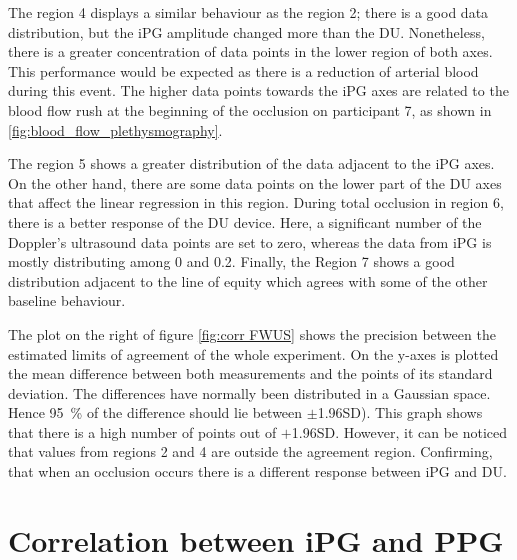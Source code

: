 The region 4 displays a similar behaviour as the region 2; there is a good data distribution, but the iPG amplitude changed more than the DU. Nonetheless, there is a greater concentration of data points in the lower region of both axes. This performance would be expected as there is a reduction of arterial blood during this event. The higher data points towards the iPG axes are related to the blood flow rush at the beginning of the occlusion on participant 7, as shown in \ref{fig:blood_flow_plethysmography}.

The region 5 shows a greater distribution of the data adjacent to the iPG axes. On the other hand, there are some data points on the lower part of the DU axes that affect the linear regression in this region. During total occlusion in region 6, there is a better response of the DU device. Here, a significant number of the Doppler's ultrasound data points are set to zero, whereas the data from iPG is mostly distributing among 0 and 0.2. Finally, the Region 7 shows a good distribution adjacent to the line of equity which agrees with some of the other baseline behaviour.

The plot on the right of figure \ref{fig:corr FWUS} shows the precision between the estimated limits of agreement of the whole experiment.  On the y-axes is plotted the mean difference between both measurements and the points of its standard deviation. The differences have normally been distributed in a Gaussian space. Hence \SI{95}{\percent} of the difference should lie between  $\pm$1.96SD). This graph shows that there is a high number of points out of $+$1.96SD. However, it can be noticed that values from regions 2 and 4 are outside the agreement region. Confirming, that when an occlusion occurs there is a different response between iPG and DU.


\section{Correlation between iPG and PPG}  %
\label{section correlation 3}

